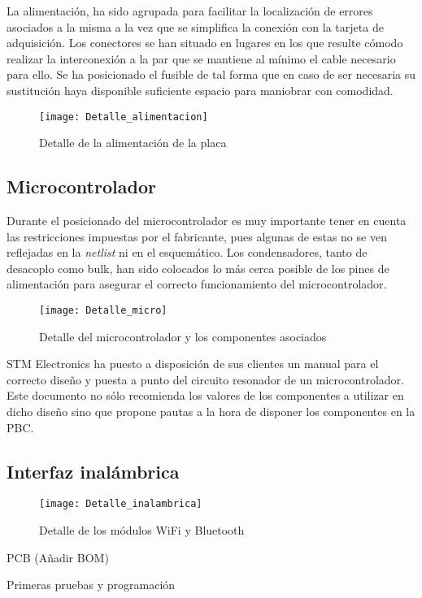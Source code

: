La alimentación, ha sido agrupada para facilitar la localización de errores asociados a la misma a la vez que se simplifica la conexión con la tarjeta de adquisición. Los conectores se han situado en lugares en los que resulte cómodo realizar la interconexión a la par que se mantiene al mínimo el cable necesario para ello. Se ha posicionado el fusible de tal forma que en caso de ser necesaria su sustitución haya disponible suficiente espacio para maniobrar con comodidad.

\begin{figure} [h]
    \centering
    \texttt{[image: Detalle\_alimentacion]}
    \caption{Detalle de la alimentación de la placa}
    \label{fig:Detalle_alimentacion}
\end{figure}

\subsection{Microcontrolador\label{sec:PCB_micro}}

Durante el posicionado del microcontrolador es muy importante tener en cuenta las restricciones impuestas por el fabricante, pues algunas de estas no se ven reflejadas en la \textit{netlist} ni en el esquemático. Los condensadores, tanto de desacoplo como bulk, han sido colocados lo más cerca posible de los pines de alimentación para asegurar el correcto funcionamiento del microcontrolador.

\begin{figure} [h]
    \centering
    \texttt{[image: Detalle\_micro]}
    \caption{Detalle del microcontrolador y los componentes asociados}
    \label{fig:Detalle_micro}
\end{figure}

STM Electronics ha puesto a disposición de sus clientes un manual para el correcto diseño y puesta a punto del circuito resonador de un microcontrolador. Este documento no sólo recomienda los valores de los componentes a utilizar en dicho diseño sino que propone pautas a la hora de disponer los componentes en la PBC.

\subsection{Interfaz inalámbrica\label{sec:PCB_inalambrica}}

\begin{figure} [h]
    \centering
    \texttt{[image: Detalle\_inalambrica]}
    \caption{Detalle de los módulos WiFi y Bluetooth}
    \label{fig:Detalle_inalambrica}
\end{figure}

	PCB (Añadir BOM)
	
	Primeras pruebas y programación
	
